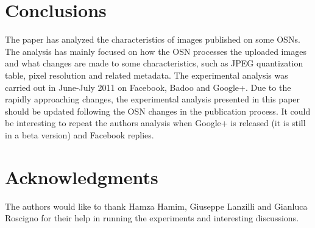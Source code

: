 \documentclass[10pt, conference]{IEEEtran}
\begin{document}
\section{Conclusions}
\label{sec6}
The paper has analyzed the characteristics of images published on some OSNs. The 
analysis has mainly focused on how the OSN processes the uploaded images and 
what changes are made to some characteristics, such as JPEG quantization table, 
pixel resolution and related metadata. The experimental analysis was carried out in June-July 2011 on Facebook, Badoo and Google+. Due to the rapidly approaching changes, the experimental analysis presented in this paper should be updated following the OSN changes in the publication process.
It could be interesting to repeat the authors analysis when Google+ is released (it is still in a beta version) and Facebook replies.


\section*{Acknowledgments}
The authors would like to thank Hamza Hamim, Giuseppe Lanzilli and Gianluca Roscigno 
for their help in running the experiments and interesting discussions.
%



\end{document}
